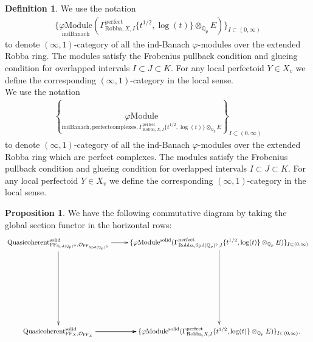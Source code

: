 \documentclass[12pt]{book}
\theoremstyle{definition}
\newtheorem{proposition}{Proposition}
\newtheorem{definition}{Definition}
\begin{document}
\begin{definition}
We use the notation
\begin{align}
\{\underset{\mathrm{indBanach}}{\varphi\mathrm{Module}}(\Gamma^\text{perfect}_{\text{Robba},X,I}\{t^{1/2},\log(t)\}\otimes_{\mathbb{Q}_p}E)\}_{I\subset (0,\infty)}
\end{align}
to denote $(\infty,1)$-category of all the ind-Banach $\varphi$-modules over the extended Robba ring. The modules satisfy the Frobenius pullback condition and glueing condition for overlapped intervals $I\subset J\subset K$. For any local perfectoid $Y\in X_v$ we define the corresponding $(\infty,1)$-category in the local sense.\\
We use the notation
\begin{align}
\left\{\underset{\mathrm{indBanach,perfectcomplexes},\Gamma^\text{perfect}_{\text{Robba},X,I}\{t^{1/2},\log(t)\}\otimes_{\mathbb{Q}_p}E}{\varphi\mathrm{Module}}\right\}_{I\subset (0,\infty)}
\end{align}
to denote $(\infty,1)$-category of all the ind-Banach $\varphi$-modules over the extended Robba ring which are perfect complexes. The modules satisfy the Frobenius pullback condition and glueing condition for overlapped intervals $I\subset J\subset K$. For any local perfectoid $Y\in X_v$ we define the corresponding $(\infty,1)$-category in the local sense. 

\end{definition}


\begin{proposition}
We have the following commutative diagram by taking the global section functor in the horizontal rows:
\[\displayindent=+0in
\xymatrix@R+7pc{
\mathrm{Quasicoherent}^{\mathrm{solid}}_{\mathrm{FF}_{\mathrm{Spd}(\mathbb{Q}_p)^\diamond},\mathcal{O}_{\mathrm{FF}_{\mathrm{Spd}(\mathbb{Q}_p)^\diamond}}} \ar[r] \ar[d] &\{\varphi\mathrm{Module}^{\mathrm{solid}}(\Gamma^\text{perfect}_{\text{Robba},{\mathrm{Spd}(\mathbb{Q}_p)^\diamond},I}\{t^{1/2},\log(t)\}\otimes_{\mathbb{Q}_p}E)\}_{I\subset (0,\infty)} \ar[d]\\
\mathrm{Quasicoherent}^{\mathrm{solid}}_{\mathrm{FF}_X,\mathcal{O}_{\mathrm{FF}_X}}  \ar[r] \ar[r] \ar[r] &\{\varphi\mathrm{Module}^{\mathrm{solid}}(\Gamma^\text{perfect}_{\text{Robba},X,I}\{t^{1/2},\log(t)\}\otimes_{\mathbb{Q}_p}E)\}_{I\subset (0,\infty)}.   
}
\]
\end{proposition}
\end{document}
